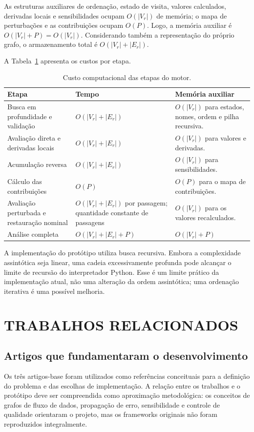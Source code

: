 \documentclass[12pt,openright,oneside,a4paper,brazil]{abntex2}
\begin{document}
As estruturas auxiliares de ordenação, estado de visita, valores calculados, derivadas locais e sensibilidades ocupam $O(|V_r|)$ de memória; o mapa de perturbações e as contribuições ocupam $O(P)$. Logo, a memória auxiliar é $O(|V_r|+P)=O(|V_r|)$. Considerando também a representação do próprio grafo, o armazenamento total é $O(|V_r|+|E_r|)$.

A Tabela~\ref{tab:custo-algoritmo} apresenta os custos por etapa.
\begin{table}[H]
\centering
\small
\caption{Custo computacional das etapas do motor.}
\label{tab:custo-algoritmo}
\begin{tabularx}{\textwidth}{p{}p{}X}
\toprule
\textbf{Etapa} & \textbf{Tempo} & \textbf{Memória auxiliar} \\
\midrule
Busca em profundidade e validação & $O(|V_r|+|E_r|)$ & $O(|V_r|)$ para estados, nomes, ordem e pilha recursiva. \\
Avaliação direta e derivadas locais & $O(|V_r|+|E_r|)$ & $O(|V_r|)$ para valores e derivadas. \\
Acumulação reversa & $O(|V_r|+|E_r|)$ & $O(|V_r|)$ para sensibilidades. \\
Cálculo das contribuições & $O(P)$ & $O(P)$ para o mapa de contribuições. \\
Avaliação perturbada e restauração nominal & $O(|V_r|+|E_r|)$ por passagem; quantidade constante de passagens & $O(|V_r|)$ para os valores recalculados. \\
\midrule
Análise completa & $O(|V_r|+|E_r|+P)$ & $O(|V_r|+P)$ \\
\bottomrule
\end{tabularx}
\end{table}

A implementação do protótipo utiliza busca recursiva. Embora a complexidade assintótica seja linear, uma cadeia excessivamente profunda pode alcançar o limite de recursão do interpretador Python. Esse é um limite prático da implementação atual, não uma alteração da ordem assintótica; uma ordenação iterativa é uma possível melhoria.

\chapter{TRABALHOS RELACIONADOS}

\section{Artigos que fundamentaram o desenvolvimento}
Os três artigos-base foram utilizados como referências conceituais para a definição do problema e das escolhas de implementação. A relação entre os trabalhos e o protótipo deve ser compreendida como aproximação metodológica: os conceitos de grafos de fluxo de dados, propagação de erro, sensibilidade e controle de qualidade orientaram o projeto, mas os frameworks originais não foram reproduzidos integralmente.
\end{document}
